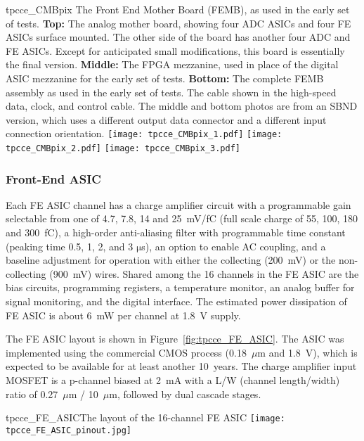 \begin{cdrfigure}{tpcce_CMBpix}
{The Front End Mother Board (FEMB), as used in the early set of tests.
  {\bf Top:} The analog mother board, showing four ADC ASICs and four FE ASICs surface mounted.
  The other side of the board has another four ADC and FE ASICs.
  Except for anticipated small modifications, this board is essentially the final version.
  {\bf Middle:} The FPGA mezzanine, used in place of the digital ASIC mezzanine for the early set of tests.
  {\bf Bottom:} The complete FEMB assembly as used in the early set of tests.
  The cable shown in the high-speed data, clock, and control cable. The middle and bottom photos are from an SBND version, which uses a different output data connector and a different input connection orientation.}
\texttt{[image: tpcce\_CMBpix\_1.pdf]}
\texttt{[image: tpcce\_CMBpix\_2.pdf]}
\texttt{[image: tpcce\_CMBpix\_3.pdf]}
\end{cdrfigure}

\subsubsection{Front-End ASIC}
 
Each FE ASIC channel has a charge amplifier circuit with a programmable gain selectable from one of 4.7, 7.8, 14 and 25~mV/fC
(full scale charge of 55, 100, 180 and 300~fC),
a high-order anti-aliasing filter with programmable time
constant (peaking time 0.5, 1, 2, and 3 $\mathrm{\mu}$s),
an option to enable AC coupling,
and a baseline adjustment for operation with either the collecting (200~mV) or the non-collecting (900~mV) wires.
Shared among the 16 channels in the FE ASIC are the bias circuits, programming registers,
a temperature monitor, an analog buffer for signal monitoring, and the digital interface.
The estimated power dissipation of FE ASIC is about 6~mW per channel at 1.8~V supply.

The FE ASIC layout is shown in Figure~\ref{fig:tpcce_FE_ASIC}.
The ASIC was implemented using the commercial CMOS process (0.18~$\mu$m and 1.8~V), which 
is expected to be available for at least another 10~years. 
The charge amplifier input MOSFET is a p-channel biased at 2~mA with a L/W (channel length/width) ratio
of 0.27~$\mu$m / 10~$\mu$m, followed by dual cascade stages.

\begin{cdrfigure}{tpcce_FE_ASIC}{The layout of the 16-channel FE ASIC}
\texttt{[image: tpcce\_FE\_ASIC\_pinout.jpg]}
\end{cdrfigure}

